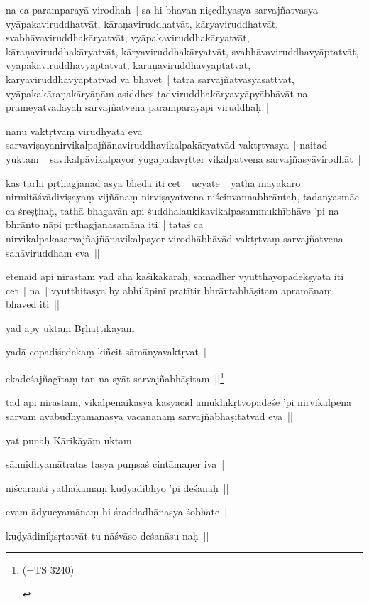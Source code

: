 \documentclass[article,12pt,a4paper]{memoir}
\begin{document}
	  \pstart na ca paramparayā virodhaḥ | sa hi bhavan niṣedhyasya sarvajñatvasya vyāpakaviruddhatvāt, kāraṇaviruddhatvāt, kāryaviruddhatvāt, svabhāvaviruddhakāryatvāt, vyāpakaviruddhakāryatvāt, kāraṇaviruddhakāryatvāt, kāryaviruddhakāryatvāt, svabhāvaviruddhavyāptatvāt, vyāpakaviruddhavyāptatvāt, kāraṇaviruddhavyāptatvāt, kāryaviruddhavyāptatvād vā bhavet | tatra sarvajñatvasyāsattvāt, vyāpakakāraṇakāryāṇām asiddhes tadviruddhakāryavyāpyābhāvāt na prameyatvādayaḥ sarvajñatvena paramparayāpi viruddhāḥ | 
	\pend
      

	  \pstart nanu vaktṛtvaṃ virudhyata eva sarvaviṣayanirvikalpajñānaviruddhavikalpakāryatvād vaktṛtvasya | naitad yuktam | savikalpāvikalpayor yugapadavṛtter vikalpatvena sarvajñasyāvirodhāt | 
	\pend
      

	  \pstart kas tarhi pṛthagjanād asya bheda iti cet | ucyate | yathā māyākāro nirmitāśvādiviṣayaṃ vijñānaṃ nirviṣayatvena niścinvannabhrāntaḥ, tadanyasmāc ca śreṣṭhaḥ, tathā bhagavān api śuddhalaukikavikalpasammukhībhāve 'pi na bhrānto nāpi pṛthagjanasamāna iti | tataś ca nirvikalpakasarvajñajñānavikalpayor virodhābhāvād vaktṛtvaṃ sarvajñatvena sahāviruddham eva || 
	\pend
      

	  \pstart etenaid api nirastam yad āha kāśikākāraḥ, samādher vyutthāyopadekṣyata iti cet | na | vyutthitasya hy abhilāpinī pratītir bhrāntabhāṣitam apramāṇaṃ bhaved iti || 
	\pend
      

	  \pstart yad apy uktaṃ Bṛhaṭṭīkāyām 
	\pend
      

	  \pstart yadā copadiśedekaṃ kiñcit sāmānyavaktṛvat | 
	\pend
      

	  \pstart ekadeśajñagītaṃ tan na syāt sarvajñabhāṣitam ||\footnote{\begin{english}(=TS 3240)\end{english}}
	\pend
      

	  \pstart tad api nirastam, vikalpenaikasya kasyacid āmukhīkṛtvopadeśe 'pi nirvikalpena sarvam avabudhyamānasya vacanānāṃ sarvajñabhāṣitatvād eva || 
	\pend
      

	  \pstart yat punaḥ Kārikāyām uktam 
	\pend
      

	  \pstart sānnidhyamātratas tasya puṃsaś cintāmaṇer iva | 
	\pend
      

	  \pstart niścaranti yathākāmāṃ kuḍyādibhyo 'pi deśanāḥ || 
	\pend
      

	  \pstart evam ādyucyamānaṃ hi śraddadhānasya śobhate | 
	\pend
      

	  \pstart kuḍyādiniḥsṛtatvāt tu nāśvāso deśanāsu naḥ || 
	\pend
      
\end{document}
